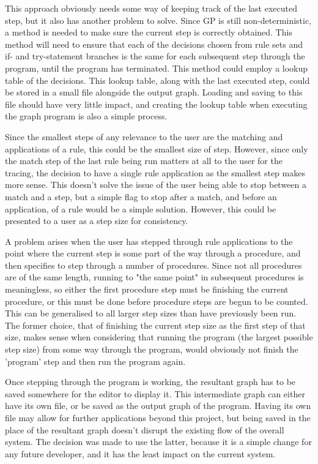 \documentclass{UoYCSproject}
\begin{document}
This approach obviously needs some way of keeping track of the last executed step, but it also has another problem to solve. Since GP is still non-deterministic, a method is needed to make sure the current step is correctly obtained. This method will need to ensure that each of the decisions chosen from rule sets and if- and try-statement branches is the same for each subsequent step through the program, until the program has terminated. This method could employ a lookup table of the decisions. This lookup table, along with the last executed step, could be stored in a small file alongside the output graph. Loading and saving to this file should have very little impact, and creating the lookup table when executing the graph program is also a simple process.

Since the smallest steps of any relevance to the user are the matching and applications of a rule, this could be the smallest size of step. However, since only the match step of the last rule being run matters at all to the user for the tracing, the decision to have a single rule application as the smallest step makes more sense. This doesn't solve the issue of the user being able to stop between a match and a step, but a simple flag to stop after a match, and before an application, of a rule would be a simple solution. However, this could be presented to a user as a step size for consistency.

A problem arises when the user has stepped through rule applications to the point where the current step is some part of the way through a procedure, and then specifies to step through a number of procedures. Since not all procedures are of the same length, running to "the same point" in subsequent procedures is meaningless, so either the first procedure step must be finishing the current procedure, or this must be done before procedure steps are begun to be counted. This can be generalised to all larger step sizes than have previously been run. The former choice, that of finishing the current step size as the first step of that size, makes sense when considering that running the program (the largest possible step size) from some way through the program, would obviously not finish the 'program' step and then run the program again.

Once stepping through the program is working, the resultant graph has to be saved somewhere for the editor to display it. This intermediate graph can either have its own file, or be saved as the output graph of the program. Having its own file may allow for further applications beyond this project, but being saved in the place of the resultant graph doesn't disrupt the existing flow of the overall system. The decision was made to use the latter, because it is a simple change for any future developer, and it has the least impact on the current system.
\end{document}
